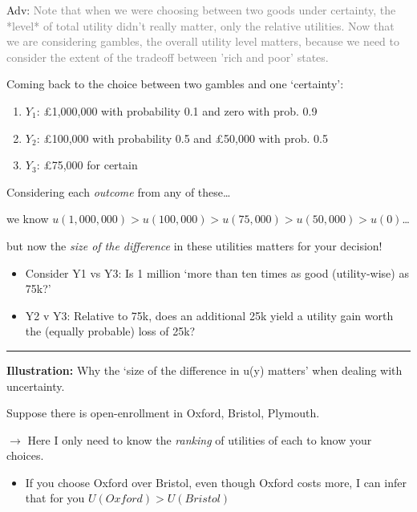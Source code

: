 \documentclass[]{article}
\providecommand{\tightlist}{%
  \setlength{\itemsep}{0pt}\setlength{\parskip}{0pt}}
\begin{document}
\bigskip

\textcolor{RawSienna}{Adv:} \textcolor{gray}{Note that when we were choosing between two goods under certainty,
the *level* of total utility didn't really matter, only the relative utilities. Now that we are considering gambles, the overall utility level matters, because we need to consider the extent of the tradeoff between 'rich and poor' states.}

\bigskip

Coming back to the choice between two gambles and one `certainty':

\begin{enumerate}
\def\labelenumi{\arabic{enumi}.}
\tightlist
\item
  \(Y_1\): \pounds1,000,000 with probability 0.1 and zero with prob. 0.9
\item
  \(Y_2\): \pounds100,000 with probability 0.5 and \pounds50,000 with prob. 0.5
\item
  \(Y_3\): \pounds75,000 for certain
\end{enumerate}

Considering each \emph{outcome} from any of these\ldots{}

we know \(u(1,000,000) > u(100,000) > u(75,000)> u(50,000) > u(0)\)\ldots{}

but now the \emph{size of the difference} in these utilities matters for your decision!

\bigskip

\begin{itemize}
\item
  Consider Y1 vs Y3: Is 1 million `more than ten times as good (utility-wise) as 75k?'
\item
  Y2 v Y3: Relative to 75k, does an additional 25k yield a utility gain worth the (equally probable) loss of 25k?
\end{itemize}

\begin{center}\rule{0.5\linewidth}{\linethickness}\end{center}

\textbf{Illustration:} Why the `size of the difference in u(y) matters' when dealing with uncertainty.

Suppose there is open-enrollment in Oxford, Bristol, Plymouth.

\(\rightarrow\) Here I only need to know the \emph{ranking} of utilities of each to know your choices.

\begin{itemize}
\tightlist
\item
  If you choose Oxford over Bristol, even though Oxford costs more, I can infer that for you \(U(Oxford)>U(Bristol)\)
\end{itemize}
\end{document}
